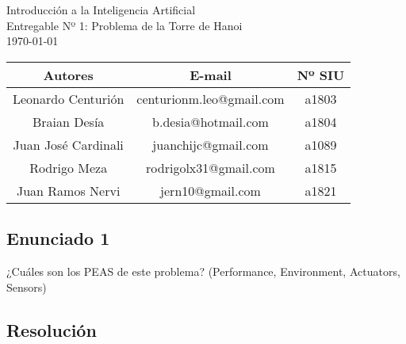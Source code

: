 \documentclass[12pt]{article}
\begin{document}
    \begingroup  
        \centering
        \LARGE Introducción a la Inteligencia Artificial\\
        \LARGE Entregable Nº 1: Problema de la Torre de Hanoi\\[0.5em]
        \large \today\\[0.5em]
        \begin{table}[h]
            \centering
            \begin{tabular}{|c|c|c|}
                \hline
                Autores & E-mail & Nº SIU \\
                \hline
                Leonardo Centurión & centurionm.leo@gmail.com & a1803 \\
                Braian Desía & b.desia@hotmail.com & a1804 \\
                Juan José Cardinali & juanchijc@gmail.com & a1089 \\ 
                Rodrigo Meza & rodrigolx31@gmail.com & a1815 \\
                Juan Ramos Nervi & jern10@gmail.com & a1821 \\
                \hline
            \end{tabular}
        \end{table}

    \endgroup

    \vspace{0.0in}

    \subsection*{Enunciado 1}
        
        ¿Cuáles son los PEAS de este problema? (Performance, Environment, Actuators, Sensors)
        \subsection*{Resolución}
            \vspace{0.1in}
\end{document}
